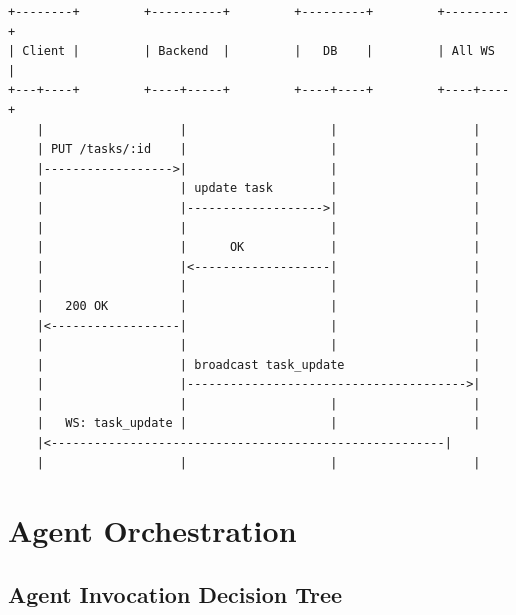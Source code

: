 \documentclass[11pt,a4paper]{article}
\begin{document}
\begin{verbatim}
+--------+         +----------+         +---------+         +---------+
| Client |         | Backend  |         |   DB    |         | All WS  |
+---+----+         +----+-----+         +----+----+         +----+----+
    |                   |                    |                   |
    | PUT /tasks/:id    |                    |                   |
    |------------------>|                    |                   |
    |                   | update task        |                   |
    |                   |------------------->|                   |
    |                   |                    |                   |
    |                   |      OK            |                   |
    |                   |<-------------------|                   |
    |                   |                    |                   |
    |   200 OK          |                    |                   |
    |<------------------|                    |                   |
    |                   |                    |                   |
    |                   | broadcast task_update                  |
    |                   |--------------------------------------->|
    |                   |                    |                   |
    |   WS: task_update |                    |                   |
    |<-------------------------------------------------------|
    |                   |                    |                   |
\end{verbatim}

\section{Agent Orchestration}

\subsection{Agent Invocation Decision Tree}
\end{document}
